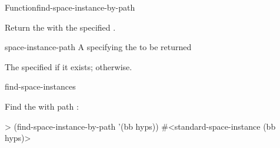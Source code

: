\documentclass[10pt,twoside,english,pdftex]{article}
\begin{document}
\begin{functiondoc}{Function}{find-space-instance-by-path}%
  { \returns{} }

\fnsyntax

\fnpurpose Return the  with the specified
. 

\fnpackage {}

\fnmodule {}

\fnargs
\begin{args}{space-instance-path}
 A  specifying the
 to be returned 
\end{args}

\fnreturns The specified  if it exists; \nil{}
otherwise.

\begin{alsos}{find-space-instances}
\end{alsos}

\fnexample
Find the  with path :
\begin{example}
> (find-space-instance-by-path '(bb hyps))
#<standard-space-instance (bb hyps)>
\end{example}

\end{functiondoc}

\end{document}
